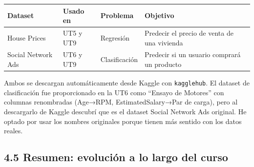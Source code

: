 \documentclass[11pt]{article}
\begin{document}
{\def\LTcaptype{none} %
\begin{longtable}[]{@{}
  >{\raggedright\arraybackslash}p{}
  >{\raggedright\arraybackslash}p{}
  >{\raggedright\arraybackslash}p{}
  >{\raggedright\arraybackslash}p{}@{}}
\toprule\noalign{}
\begin{minipage}[b]{\linewidth}\raggedright
Dataset
\end{minipage} & \begin{minipage}[b]{\linewidth}\raggedright
Usado en
\end{minipage} & \begin{minipage}[b]{\linewidth}\raggedright
Problema
\end{minipage} & \begin{minipage}[b]{\linewidth}\raggedright
Objetivo
\end{minipage} \\
\midrule\noalign{}
\endhead
\bottomrule\noalign{}
\endlastfoot
House Prices & UT5 y UT9 & Regresión & Predecir el precio de venta de
una vivienda \\
Social Network Ads & UT6 y UT9 & Clasificación & Predecir si un usuario
comprará un producto \\
\end{longtable}
}

Ambos se descargan automáticamente desde Kaggle con \texttt{kagglehub}.
El dataset de clasificación fue proporcionado en la UT6 como ``Ensayo de
Motores'' con columnas renombradas (Age→RPM, EstimatedSalary→Par de
carga), pero al descargarlo de Kaggle descubrí que es el dataset Social
Network Ads original. He optado por usar los nombres originales porque
tienen más sentido con los datos reales.

\subsection{4.5 Resumen: evolución a lo largo del
curso}\label{resumen-evoluciuxf3n-a-lo-largo-del-curso}
\end{document}
